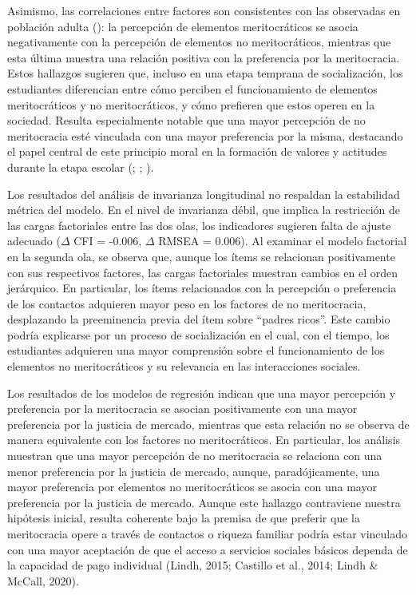 \documentclass[
  12pt,
  letterpaper,
]{article}
\begin{document}
Asimismo, las correlaciones entre factores son consistentes con las
observadas en población adulta
():
la percepción de elementos meritocráticos se asocia negativamente con la
percepción de elementos no meritocráticos, mientras que esta última
muestra una relación positiva con la preferencia por la meritocracia.
Estos hallazgos sugieren que, incluso en una etapa temprana de
socialización, los estudiantes diferencian entre cómo perciben el
funcionamiento de elementos meritocráticos y no meritocráticos, y cómo
prefieren que estos operen en la sociedad. Resulta especialmente notable
que una mayor percepción de no meritocracia esté vinculada con una mayor
preferencia por la misma, destacando el papel central de este principio
moral en la formación de valores y actitudes durante la etapa escolar
(;
;
).

Los resultados del análisis de invarianza longitudinal no respaldan la
estabilidad métrica del modelo. En el nivel de invarianza débil, que
implica la restricción de las cargas factoriales entre las dos olas, los
indicadores sugieren falta de ajuste adecuado (\(\Delta\) CFI = -0.006,
\(\Delta\) RMSEA = 0.006). Al examinar el modelo factorial en la segunda
ola, se observa que, aunque los ítems se relacionan positivamente con
sus respectivos factores, las cargas factoriales muestran cambios en el
orden jerárquico. En particular, los ítems relacionados con la
percepción o preferencia de los contactos adquieren mayor peso en los
factores de no meritocracia, desplazando la preeminencia previa del ítem
sobre ``padres ricos''. Este cambio podría explicarse por un proceso de
socialización en el cual, con el tiempo, los estudiantes adquieren una
mayor comprensión sobre el funcionamiento de los elementos no
meritocráticos y su relevancia en las interacciones sociales.

Los resultados de los modelos de regresión indican que una mayor
percepción y preferencia por la meritocracia se asocian positivamente
con una mayor preferencia por la justicia de mercado, mientras que esta
relación no se observa de manera equivalente con los factores no
meritocráticos. En particular, los análisis muestran que una mayor
percepción de no meritocracia se relaciona con una menor preferencia por
la justicia de mercado, aunque, paradójicamente, una mayor preferencia
por elementos no meritocráticos se asocia con una mayor preferencia por
la justicia de mercado. Aunque este hallazgo contraviene nuestra
hipótesis inicial, resulta coherente bajo la premisa de que preferir que
la meritocracia opere a través de contactos o riqueza familiar podría
estar vinculado con una mayor aceptación de que el acceso a servicios
sociales básicos dependa de la capacidad de pago individual (Lindh,
2015; Castillo et al., 2014; Lindh \& McCall, 2020).
\end{document}
